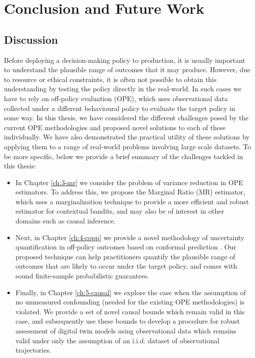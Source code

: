 \chapter{\label{ch:6-conclusion}Conclusion and Future Work} 

\minitoc

\section{Discussion}

Before deploying a decision-making policy to production, it is usually important to understand the
plausible range of outcomes that it may produce. However, due to resource or ethical constraints, it is
often not possible to obtain this understanding by testing the policy directly in the real-world. In such
cases we have to rely on off-policy evaluation (OPE), which uses observational data collected under a different behavioural policy to evaluate the target policy in some way. 
In this thesis, we have considered the different challenges posed by the current OPE methodologies and proposed novel solutions to each of these individually.
We have also demonstrated the practical utility of these solutions by applying them to a range of real-world problems involving large scale datasets.
To be more specific, below we provide a brief summary of the challenges tackled in this thesis:
\begin{itemize}
    \item In Chapter \ref*{ch:3-mr} we consider the problem of variance reduction in OPE estimators. To address this, we propose the Marginal Ratio (MR) estimator, which uses a marginalization technique to provide a more efficient and robust estimator for contextual bandits, and may also be of interest in other domains such as causal inference. 
    \item Next, in Chapter \ref*{ch:4-copp} we provide a novel methodology of uncertainty quantification in off-policy outcomes based on conformal prediction \citep{vovk2005algorithmic}. Our proposed technique can help practitioners quantify the plausible range of outcomes that are likely to occur under the target policy, and comes with sound finite-sample probabilistic guarantees.
    \item Finally, in Chapter \ref*{ch:5-causal} we explore the case when the assumption of no unmeasured confounding (needed for the existing OPE methodologies) is violated. 
    We provide a set of novel causal bounds which remain valid in this case, and subsequently use these bounds to develop a procedure for robust assessment of digital twin models using observational data which remains valid under only the assumption of an i.i.d. dataset of observational trajectories. 
\end{itemize}

